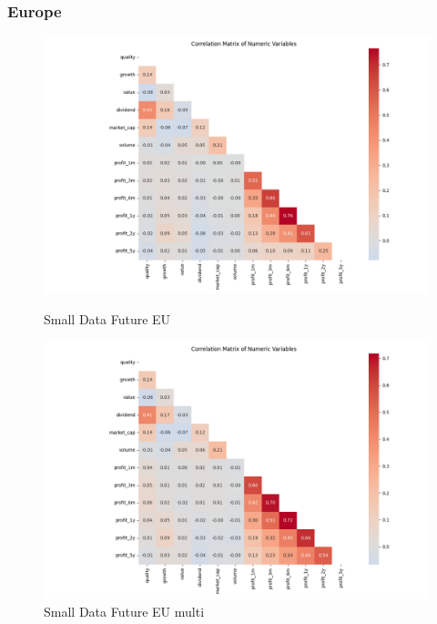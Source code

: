 \documentclass[11pt,english,a4paper,hidelinks]{book}
\begin{document}
\subsubsection{Europe}
\begin{figure}[H]
    \centering
    \begin{minipage}{0.48\textwidth}
        \centering
        \includegraphics[width=\linewidth]{images/code/descriptive analysis/correlations/Small Data future EU.png}
        \caption{Small Data Future EU}
        \label{fig:small_data_future_eu_correlations}
    \end{minipage}
    \begin{minipage}{0.48\textwidth}
        \centering
        \includegraphics[width=\linewidth]{images/code/descriptive analysis/correlations/Small Data future EU - Multi.png}
        \caption{Small Data Future EU \acrshort{multi}}
        \label{fig:small_data_future_eu_multi_correlations}
    \end{minipage}
\end{figure}
\end{document}
